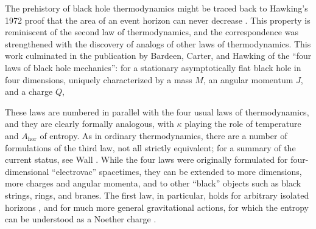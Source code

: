 \documentclass[11pt]{article}
\begin{document}
The prehistory of black hole thermodynamics might be traced back to Hawking's
1972 proof that the area of an event horizon can never decrease \cite{Hawkingb}.
This property is reminiscent of the second law of thermodynamics, and the 
correspondence was strengthened with the discovery of analogs of other 
laws of thermodynamics.  This work culminated in the publication
by Bardeen, Carter, and Hawking \cite{BCH}  of the ``four laws of black hole
mechanics'': for a stationary asymptotically flat black hole in four dimensions, 
uniquely characterized by a mass $M$, an angular momentum $J$, and a 
charge $Q$,
\begin{center}
\end{center}

These laws are numbered in parallel with the four usual laws of thermodynamics,
and they are clearly formally analogous, with $\kappa$ playing the role 
of temperature and $A_{\mathrm{\scriptstyle hor}}$ of entropy.  
As in ordinary thermodynamics, 
there are a number of formulations of the third law, not all strictly 
equivalent; for a summary of the current status, see Wall \cite{Wall}.  
While the four laws were originally formulated for four-dimensional 
``electrovac'' spacetimes, they can be extended to more dimensions, 
more charges and angular momenta, and to other ``black'' objects
such as black strings, rings, and branes.  The first law, in particular, 
holds for arbitrary isolated horizons \cite{Ashisol}, and for much 
more general gravitational actions, for which the entropy can be 
understood as a Noether charge \cite{Wald_Noether}.
\end{document}
